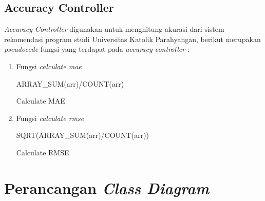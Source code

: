 \subsection{Accuracy Controller}
\label{subsec:accuracy}

\textit{Accuracy Controller} digunakan untuk menghitung akurasi dari sistem rekomendasi program studi Universitas Katolik Parahyangan, berikut merupakan \textit{pseudocode} fungsi yang terdapat pada \textit{accuracy controller} :

\begin{enumerate}
    \item Fungsi \textit{calculate mae}\\
    
        \begin{algorithm}[H]
            \begin{algorithmic}[1]
                   \State \Return ARRAY\_SUM(arr)/COUNT(arr)
                \EndProcedure
            \end{algorithmic} 
            \caption{Calculate MAE}
            \label{alg:calculateMAE}
        \end{algorithm}
    
    \item Fungsi \textit{calculate rmse}\\
    
        \begin{algorithm}[H]
            \begin{algorithmic}[1]
                   \State \Return SQRT(ARRAY\_SUM(arr)/COUNT(arr))
                \EndProcedure
            \end{algorithmic} 
            \caption{Calculate RMSE}
            \label{alg:calculateRMSE}
        \end{algorithm}
\end{enumerate}

\section{Perancangan \textit{Class Diagram}}
\label{sec:perancangan class diagram}

